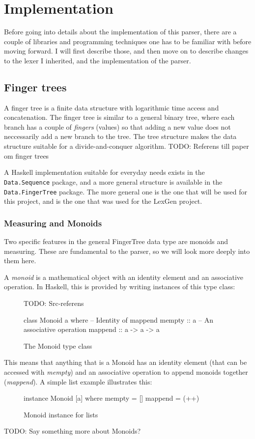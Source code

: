 \documentclass[a4paper,12pt,twosided]{report}
\begin{document}
%
%

\chapter{Implementation}
Before going into details about the implementation of this parser, there are a
couple of libraries and programming techniques one has to be familiar with
before moving forward. I will first describe those, and then move on to describe
changes to the lexer I inherited, and the implementation of the parser.

\section{Finger trees}
A finger tree is a finite data structure with logarithmic time access and
concatenation. The finger tree is similar to a general binary tree, where each
branch has a couple of \textit{fingers} (values) so that adding a new value does
not neccessarily add a new branch to the tree. The tree structure makes the data
structure suitable for a divide-and-conquer algorithm. TODO: Referens till paper
om finger trees

A Haskell implementation suitable for everyday needs exists in the
\texttt{Data.Sequence} package, and a more general structure is available in the
\texttt{Data.FingerTree} package. The more general one is the one that will be
used for this project, and is the one that was used for the LexGen project.

\subsection{Measuring and Monoids}
Two specific features in the general FingerTree data type are monoids and
measuring. These are fundamental to the parser, so we will look more deeply into
them here.

A \textit{monoid} is a mathematical object with an identity element and an
associative operation. In Haskell, this is provided by writing instances of this
type class:
\begin{figure}[H]
TODO: Src-referens
\begin{code}
class Monoid a where
    -- Identity of mappend
    mempty  :: a
    -- An associative operation
    mappend :: a -> a -> a
\end{code}
\caption{The Monoid type class}
\end{figure}
This means that anything that is a Monoid has an identity element (that can be
accessed with \textit{mempty}) and an associative operation to append monoids
together (\textit{mappend}). A simple list example illustrates this:
\begin{figure}[H]
\begin{code}
instance Monoid [a] where
    mempty = []
    mappend = (++)
\end{code}
\caption{Monoid instance for lists}
\end{figure}
TODO: Say something more about Monoids?
\end{document}
